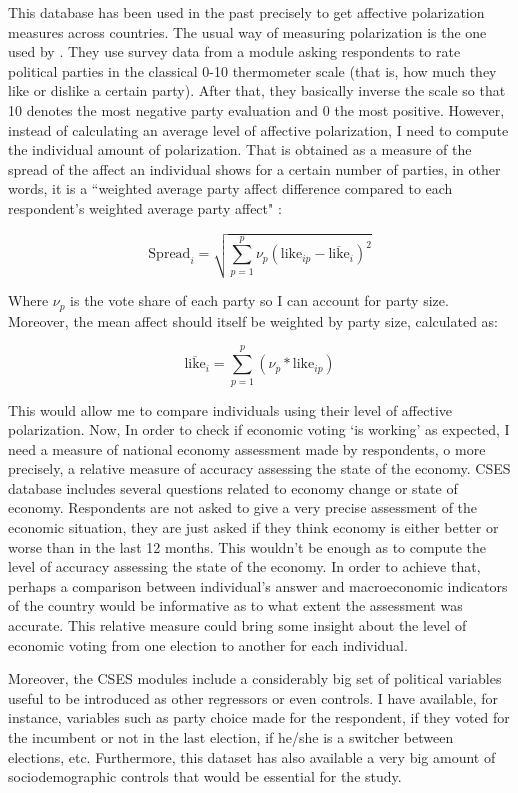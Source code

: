 \documentclass[a4paper, svgnames]{article}
\begin{document}
This database has been used in the past precisely to get affective polarization measures across countries. The usual way of measuring polarization is the one used by \cite{Gidron2018}. They use survey data from a module asking respondents to rate political parties in the classical 0-10 thermometer scale (that is, how much they like or dislike a certain party). After that, they basically inverse the scale so that 10 denotes the most negative party evaluation and 0 the most positive. However, instead of calculating an average level of affective polarization, I need to compute the individual amount of polarization. That is obtained as a measure of the spread of the affect an individual shows for a certain number of parties, in other words, it is a ``weighted average party affect difference compared to each respondent's weighted average party affect" \citep{Wagner2021}:

$$
\text{Spread}_i = \sqrt{\sum^p_{p=1}\nu_p(\text{like}_{ip}-\overline{\text{like}}_i)^2}
$$

Where $\nu_p$ is the vote share of each party so I can account for party size. Moreover, the mean affect should itself be weighted by party size, calculated as:

$$
\overline{\text{like}}_i = \sum^p_{p=1} (\nu_p * \text{like}_{ip})
$$

This would allow me to compare individuals using their level of affective polarization. Now, In order to check if economic voting `is working' as expected, I need a measure of national economy assessment made by respondents, o more precisely, a relative measure of accuracy assessing the state of the economy. CSES database includes several questions related to economy change or state of economy. Respondents are not asked to give a very precise assessment of the economic situation, they are just asked if they think economy is either better or worse than in the last 12 months. This wouldn't be enough as to compute the level of accuracy assessing the state of the economy. In order to achieve that, perhaps a comparison between individual's answer and macroeconomic indicators of the country would be informative as to what extent the assessment was accurate. This relative measure could bring some insight about the level of economic voting from one election to another for each individual.

Moreover, the CSES modules include a considerably big set of political variables useful to be introduced as other regressors or even controls. I have available, for instance, variables such as party choice made for the respondent, if they voted for the incumbent or not in the last election, if he/she is a switcher between elections, etc. Furthermore, this dataset has also available a very big amount of sociodemographic controls that would be essential for the study.
\end{document}
